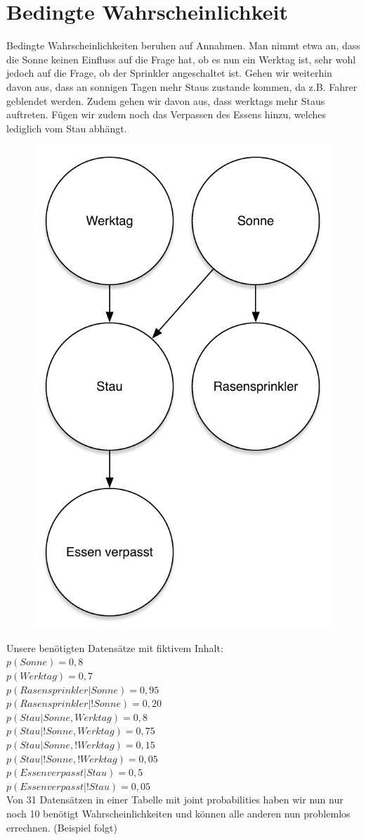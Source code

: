 \section{Bedingte Wahrscheinlichkeit}
Bedingte Wahrscheinlichkeiten beruhen auf Annahmen.
Man nimmt etwa an, dass die Sonne keinen Einfluss auf die Frage hat, ob es nun ein Werktag ist, sehr wohl jedoch auf die Frage, ob der Sprinkler angeschaltet ist.
Gehen wir weiterhin davon aus, dass an sonnigen Tagen mehr Staus zustande kommen, da z.B. Fahrer geblendet werden.
Zudem gehen wir davon aus, dass werktags mehr Staus auftreten.
Fügen wir zudem noch das Verpassen des Essens hinzu, welches lediglich vom Stau abhängt.

\begin{figure}[h]
    \centering
    \includegraphics[width=.2\textwidth]{chapters/bayes/bayes_example.pdf}
\end{figure}

Unsere benötigten Datensätze mit fiktivem Inhalt:\\
$p(Sonne) = 0,8$\\
$p(Werktag)= 0,7$\\
$p(Rasensprinkler | Sonne) = 0,95$\\
$p(Rasensprinkler | !Sonne) = 0,20$\\
$p(Stau | Sonne,Werktag) = 0,8$\\
$p(Stau | !Sonne, Werktag) = 0,75$\\
$p(Stau | Sonne, !Werktag) = 0,15$\\
$p(Stau | !Sonne, !Werktag) = 0,05$\\
$p(Essen verpasst | Stau) = 0,5$\\
$p(Essen verpasst | !Stau) = 0,05$\\

Von 31 Datensätzen in einer Tabelle mit joint probabilities haben wir nun nur noch 10 benötigt Wahrscheinlichkeiten und können alle anderen nun problemlos errechnen. (Beispiel folgt)

